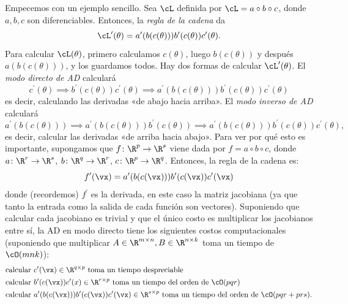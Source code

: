 \documentclass[../../book-main_es.tex]{subfiles}
\begin{document}
Empecemos con un ejemplo sencillo. Sea \(\cL\) definida por \(\cL
= a \circ b \circ c\), donde \(a, b, c\) son diferenciables. Entonces, la
\textit{regla de la cadena} da
\begin{equation}
    \cL^{\prime}(\theta) =
    a^{\prime}(b(c(\theta)))b^{\prime}(c(\theta))c^{\prime}(\theta).
\end{equation}
Para calcular \(\cL(\theta)\), primero calculamos \(c(\theta)\), luego
\(b(c(\theta))\) y después \(a(b(c(\theta)))\), y los guardamos todos. Hay
dos formas de calcular \(\cL^{\prime}(\theta)\). El
\textit{modo directo de AD} calculará
\begin{equation}
    c^{\prime}(\theta) \implies
    b^{\prime}(c(\theta))c^{\prime}(\theta) \implies
    a^{\prime}(b(c(\theta)))b^{\prime}(c(\theta))c^{\prime}(\theta)
\end{equation}
es decir, calculando las derivadas «de abajo hacia arriba». El
\textit{modo inverso de AD} calculará
\begin{equation}
    a^{\prime}(b(c(\theta))) \implies
    a^{\prime}(b(c(\theta)))b^{\prime}(c(\theta)) \implies
    a^{\prime}(b(c(\theta)))b^{\prime}(c(\theta))c^{\prime}(\theta),
\end{equation}
es decir, calcular las derivadas «de arriba hacia abajo». Para ver por qué
esto es importante, supongamos que \(f \colon \R^{p} \to \R^{s}\) viene dada por
\(f = a \circ b \circ c\), donde \(a \colon \R^{r} \to \R^{s}\), \(b
\colon \R^{q} \to \R^{r}\), \(c \colon \R^{p} \to \R^{q}\). Entonces, la
regla de la cadena es:
\begin{equation}
    f^{\prime}(\vx) = a^{\prime}(b(c(\vx)))b^{\prime}(c(\vx))c^{\prime}(\vx)
\end{equation}
donde (recordemos) \(f^{\prime}\) es la derivada, en este caso la
matriz jacobiana (ya que tanto la entrada como la salida de cada función son
vectores). Suponiendo que calcular cada jacobiano es trivial y que el
único costo es multiplicar los jacobianos entre sí, la AD en modo directo tiene
los siguientes costos computacionales (suponiendo que multiplicar \(A \in
\R^{m \times n}, B \in \R^{n \times k}\) toma un tiempo de \(\cO(mnk)\)):
\begin{align}
    &\text{calcular}\ c^{\prime}(\vx) \in \R^{q \times
    p}\ \text{toma un tiempo despreciable} \\
    &\text{calcular}\ b^{\prime}(c(\vx))c^{\prime}(x) \in \R^{r
    \times p}\ \text{toma un tiempo del orden de \(\cO(pqr)\)} \\
    &\text{calcular}\ a^{\prime}(b(c(\vx)))b^{\prime}(c(\vx))c^{\prime}(\vx)
    \in \R^{s \times p}\ \text{toma un tiempo del orden de \(\cO(pqr + prs)\).}
\end{align}
\end{document}
